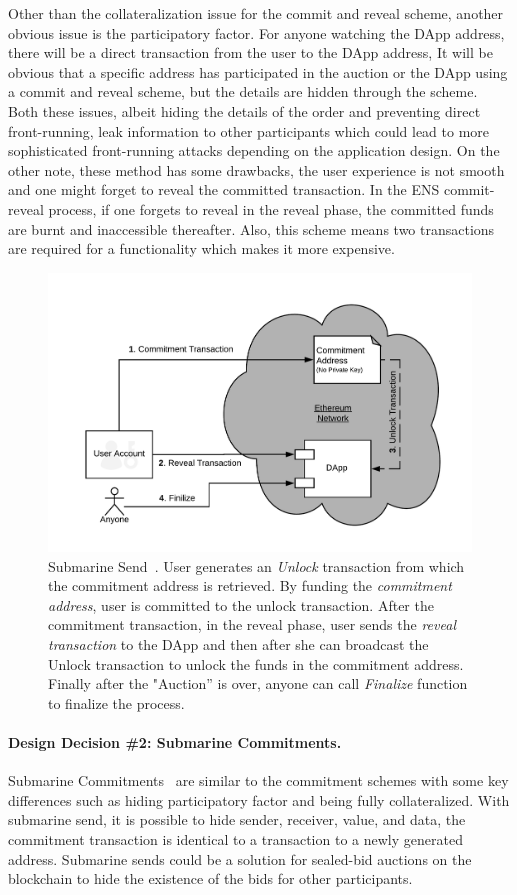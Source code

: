 Other than the collateralization issue for the commit and reveal scheme, another obvious issue is the participatory factor. For anyone watching the DApp address, there will be a direct transaction from the user to the DApp address, It will be obvious that a specific address has participated in the auction or the DApp using a commit and reveal scheme, but the details are hidden through the scheme. Both these issues, albeit hiding the details of the order and preventing direct front-running, leak information to other participants which could lead to more sophisticated front-running attacks depending on the application design. On the other note, these method has some drawbacks, the user experience is not smooth and one might forget to reveal the committed transaction. In the ENS commit-reveal process, if one forgets to reveal in the reveal phase, the committed funds are burnt and inaccessible thereafter. Also, this scheme means two transactions are required for a functionality which makes it more expensive.

\begin{figure}[t]
\centering
\includegraphics[width=0.5\linewidth]{figures/LibSubmarine.png}
\caption{\scriptsize Submarine Send~\cite{libsubmarine}. User generates an \textit{Unlock} transaction from which the commitment address is retrieved. By funding the \textit{commitment address}, user is committed to the unlock transaction. After the commitment transaction, in the reveal phase, user sends the \textit{reveal transaction} to the DApp and then after she can broadcast the Unlock transaction to unlock the funds in the commitment address. Finally after the "Auction'' is over, anyone can call \textit{Finalize} function to finalize the process.  \label{fig:LibSubmarine}}
\end{figure}

\paragraph{Design Decision \#2: Submarine Commitments.}\label{submarineCommits}
Submarine Commitments~\cite{breidenbach2018enter, submarinesendHD} are similar to the commitment schemes with some key differences such as hiding participatory factor and being fully collateralized. With submarine send, it is possible to hide sender, receiver, value, and data, the commitment transaction is identical to a transaction to a newly generated address. Submarine sends could be a solution for sealed-bid auctions on the blockchain to hide the existence of the bids for other participants. 

